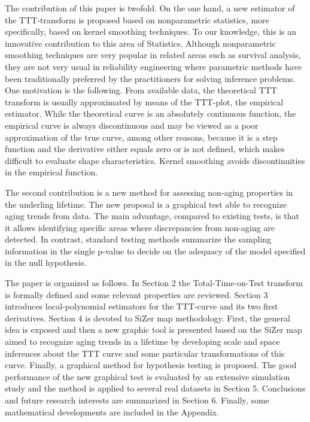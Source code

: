 \documentclass[preprint,12pt]{elsarticle}
\begin{document}
The contribution of this paper is twofold. On the one hand, a new estimator of the TTT-transform is proposed based on nonparametric statistics, more specifically, based on kernel smoothing techniques. To our knowledge, this is an innovative contribution to this area of Statistics. Although nonparametric smoothing techniques are very popular in related areas such as survival analysis, they are not very usual in reliability engineering where parametric methods have been traditionally preferred by the practitioners for solving inference problems. 
One motivation is the following. From available data, the theoretical TTT transform is usually approximated by means of the TTT-plot, the empirical estimator. While the theoretical curve is an absolutely continuous function, the empirical curve is always discontinuous and may be viewed as a poor approximation of the true curve, among other reasons, because it is a step function and the derivative either equals zero or is not defined, which makes difficult to evaluate shape characteristics. Kernel smoothing avoids discontinuities in the empirical function.

The second contribution is a new method for assessing non-aging properties in the underling lifetime. The new proposal is a graphical test able to recognize aging trends from data. The main advantage, compared to existing tests, is that it allows identifying specific areas where discrepancies from non-aging are detected. In contrast, standard testing methods summarize the sampling information in the single p-value to decide on the adequacy of the model specified in the null hypothesis.

The paper is organized as follows. In Section 2 the Total-Time-on-Test transform is formally defined and some relevant properties are reviewed. Section 3 introduces local-polynomial estimators for the TTT-curve and its two first derivatives. Section 4 is devoted to SiZer map methodology. First,  the general idea is exposed and then a new graphic tool is presented based on the SiZer map aimed to recognize aging trends in a lifetime by developing scale and space inferences about the TTT curve and some particular transformations of this curve. Finally, a graphical method for hypothesis testing is proposed. The good performance of the new graphical test is evaluated by an extensive simulation study and the method is applied to several real datasets in Section 5. Conclusions and future research interests are summarized in Section 6. Finally, some mathematical developments are included in the Appendix.
\end{document}
